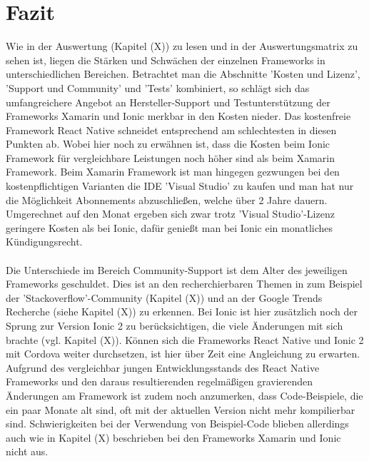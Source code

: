 \chapter{Fazit}

Wie in der Auswertung (Kapitel (X)) zu lesen und in der Auswertungsmatrix zu sehen ist, liegen die Stärken und Schwächen der einzelnen Frameworks in unterschiedlichen Bereichen. Betrachtet man die Abschnitte 'Kosten und Lizenz', 'Support und Community' und 'Tests' kombiniert, so schlägt sich das umfangreichere Angebot an Hersteller-Support und Testunterstützung der Frameworks Xamarin und Ionic merkbar in den Kosten nieder. Das kostenfreie Framework React Native schneidet entsprechend am schlechtesten in diesen Punkten ab. Wobei hier noch zu erwähnen ist, dass die Kosten beim Ionic Framework für vergleichbare Leistungen noch höher sind als beim Xamarin Framework. Beim Xamarin Framework ist man hingegen gezwungen bei den kostenpflichtigen Varianten die IDE 'Visual Studio' zu kaufen und man hat nur die Möglichkeit Abonnements abzuschließen, welche über 2 Jahre dauern. Umgerechnet auf den Monat ergeben sich zwar trotz 'Visual Studio'-Lizenz geringere Kosten als bei Ionic, dafür genießt man bei Ionic ein monatliches Kündigungsrecht. 
\\
\\
Die Unterschiede im Bereich Community-Support ist dem Alter des jeweiligen Frameworks geschuldet. Dies ist an den recherchierbaren Themen in zum Beispiel der 'Stackoverflow'-Community (Kapitel (X)) und an der Google Trends Recherche (siehe Kapitel (X)) zu erkennen. Bei Ionic ist hier zusätzlich noch der Sprung zur Version Ionic 2 zu berücksichtigen, die viele Änderungen mit sich brachte (vgl. Kapitel (X)). Können sich die Frameworks React Native und Ionic 2 mit Cordova weiter durchsetzen, ist hier über Zeit eine Angleichung zu erwarten. Aufgrund des vergleichbar jungen Entwicklungsstands des React Native Frameworks und den daraus resultierenden regelmäßigen gravierenden Änderungen am Framework ist zudem noch anzumerken, dass Code-Beispiele, die ein paar Monate alt sind, oft mit der aktuellen Version nicht mehr kompilierbar sind. Schwierigkeiten bei der Verwendung von Beispiel-Code blieben allerdings auch wie in Kapitel (X) beschrieben bei den Frameworks Xamarin und Ionic nicht aus.
\\
\\
